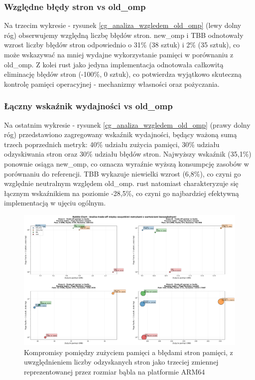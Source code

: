 \subsubsection{Względne błędy stron vs old\_omp}
Na trzecim wykresie - rysunek \ref{cg_analiza_wzgledem_old_omp} (lewy dolny róg) obserwujemy względną liczbę błędów stron. new\_omp i TBB odnotowały wzrost liczby błędów stron odpowiednio o 31\% (38 sztuk) i 2\% (35 sztuk), co może wskazywać na mniej wydajne wykorzystanie pamięci w porównaniu z old\_omp. Z kolei rust jako jedyna implementacja odnotowała całkowitą eliminację błędów stron (-100\%, 0 sztuk), co potwierdza wyjątkowo skuteczną kontrolę pamięci operacyjnej - mechanizmy własności oraz pożyczania.

\subsubsection{Łączny wskaźnik wydajności vs old\_omp}
Na ostatnim wykresie - rysunek \ref{cg_analiza_wzgledem_old_omp} (prawy dolny róg) przedstawiono zagregowany wskaźnik wydajności, będący ważoną sumą trzech poprzednich metryk: 40\% udziału zużycia pamięci, 30\% udziału odzyskiwania stron oraz 30\% udziału błędów stron. Najwyższy wskaźnik (35,1\%) ponownie osiąga new\_omp, co oznacza wyraźnie wyższą konsumpcję zasobów w porównaniu do referencji. TBB wykazuje niewielki wzrost (6,8\%), co czyni go względnie neutralnym względem old\_omp. rust natomiast charakteryzuje się łącznym wskaźnikiem na poziomie -28,5\%, co czyni go najbardziej efektywną implementacją w ujęciu ogólnym.

\begin{figure}[H]
    \centering
    \includegraphics[width=\textwidth]{analiza/images/parallel/cg/arm/chart_06_bubble_chart.png}
    \caption{Kompromisy  pomiędzy zużyciem pamięci a błędami stron pamięci, z uwzględnieniem liczby odzyskanych stron jako trzeciej zmiennej reprezentowanej przez rozmiar bąbla na platformie ARM64}
    \label{cg_kompromisy_pamiec_bledy}
\end{figure}

